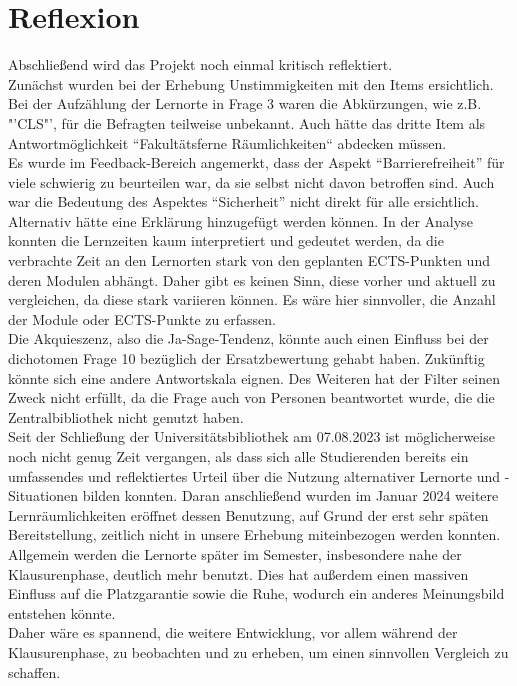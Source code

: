 \documentclass[11pt, a4paper]{article}
\begin{document}
\section{Reflexion}
Abschließend wird das Projekt noch einmal kritisch reflektiert. \\
Zunächst wurden bei der Erhebung Unstimmigkeiten mit den Items ersichtlich.
Bei der Aufzählung der Lernorte in Frage 3 waren die Abkürzungen, wie z.B. "'CLS"', für die Befragten teilweise unbekannt. Auch hätte das dritte Item als Antwortmöglichkeit “Fakultätsferne Räumlichkeiten“ abdecken müssen. \\
Es wurde im Feedback-Bereich angemerkt, dass der Aspekt “Barrierefreiheit” für viele schwierig zu beurteilen war, da sie selbst nicht davon betroffen sind. Auch war die Bedeutung des Aspektes “Sicherheit” nicht direkt für alle ersichtlich. Alternativ hätte eine Erklärung hinzugefügt werden können.
In der Analyse konnten die Lernzeiten kaum interpretiert und gedeutet werden, da die verbrachte Zeit an den Lernorten stark von den geplanten ECTS-Punkten und deren Modulen abhängt. Daher gibt es keinen Sinn, diese vorher und aktuell zu vergleichen, da diese stark variieren können. Es wäre hier sinnvoller, die Anzahl der Module oder ECTS-Punkte zu erfassen.\\
Die Akquieszenz, also die Ja-Sage-Tendenz, könnte auch einen Einfluss bei der dichotomen Frage 10 bezüglich der Ersatzbewertung gehabt haben. Zukünftig könnte sich eine andere Antwortskala eignen. Des Weiteren hat der Filter seinen Zweck nicht erfüllt, da die Frage auch von Personen beantwortet wurde, die die Zentralbibliothek nicht genutzt haben.\\
Seit der Schließung der Universitätsbibliothek am 07.08.2023 ist möglicherweise noch nicht genug Zeit vergangen, als dass sich alle Studierenden bereits ein umfassendes und reflektiertes Urteil über die Nutzung alternativer Lernorte und -Situationen bilden konnten. 
Daran anschließend wurden im Januar 2024 weitere Lernräumlichkeiten eröffnet dessen Benutzung, auf Grund der erst sehr späten Bereitstellung, zeitlich nicht in unsere Erhebung miteinbezogen werden konnten. \\
Allgemein werden die Lernorte später im Semester, insbesondere nahe der Klausurenphase, deutlich mehr benutzt. Dies hat außerdem einen massiven Einfluss auf die Platzgarantie sowie die Ruhe, wodurch ein anderes Meinungsbild entstehen könnte.\\
Daher wäre es spannend, die weitere Entwicklung, vor allem während der Klausurenphase, zu beobachten und zu erheben, um einen sinnvollen Vergleich zu schaffen.\\
\end{document}

